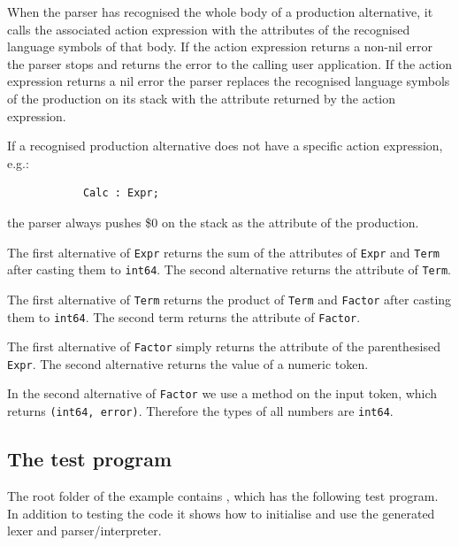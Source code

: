 \documentclass[12pt]{article}
\begin{document}
		When the parser has recognised the whole body of a production alternative, it calls the associated action expression with the attributes of the recognised language symbols of that body. If the action expression returns a non-nil error the parser stops and returns the error to the calling user application. If the action expression returns a nil error the parser replaces the recognised language symbols of the production on its stack with the attribute returned by the action expression.

		If a recognised production alternative does not have a specific action expression, e.g.:
		\begin{verbatim}
			Calc : Expr;
		\end{verbatim}

		the parser always pushes \$0 on the stack as the attribute of the production.

		The first alternative of \verb|Expr| returns the sum of the attributes of \verb|Expr| and \verb|Term| after casting them to \verb|int64|. The second alternative returns the attribute of \verb|Term|.

		The first alternative of \verb|Term| returns the product of \verb|Term| and \verb|Factor| after casting them to \verb|int64|. The second term returns the attribute of \verb|Factor|.

		The first alternative of \verb|Factor| simply returns the attribute of the parenthesised \verb|Expr|. The second alternative returns the value of a numeric token.

		In the second alternative of \verb|Factor| we use a method on the input token, which returns
		\verb|(int64, error)|. Therefore the types of all numbers are \verb|int64|.

	\subsection{The test program}
		The root folder of the  example contains , which has the following test program. In addition to testing the code it shows how to initialise and use the generated lexer and parser/interpreter.
\end{document}
